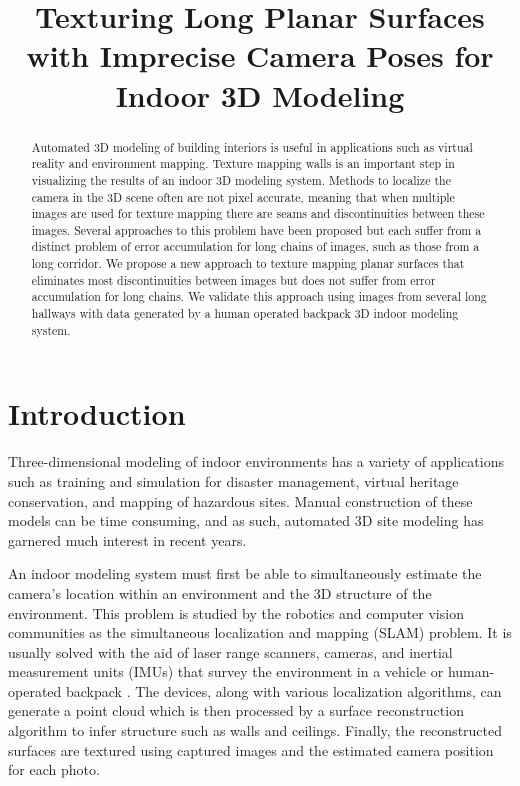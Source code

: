 \documentclass[runningheads]{llncs}
\begin{document}


\pagestyle{headings}

\mainmatter

\title{Texturing Long Planar Surfaces with Imprecise Camera Poses for Indoor 3D Modeling}

\maketitle

\begin{abstract}
Automated 3D modeling of building interiors is useful in
applications such as virtual reality and environment mapping.
Texture mapping walls is an important step in visualizing the results of an indoor 3D modeling system. Methods to localize the camera in the 3D scene often are not pixel accurate, meaning that when multiple images are used for texture mapping there are seams and discontinuities between these images. Several approaches to this problem have been proposed but each suffer from a distinct problem of error accumulation for long chains of images, such as those from a long corridor. We propose a new approach to texture mapping planar surfaces that eliminates most discontinuities between images but does not suffer from error accumulation for long chains. We validate this approach using images from several long hallways with data generated by a human operated backpack 3D indoor modeling system.

\end{abstract}

\section{Introduction}
\label{sec:intro}

Three-dimensional modeling of indoor environments has a variety of applications such as training and simulation for disaster management, virtual heritage conservation, and mapping of hazardous sites. Manual construction of these models can be time consuming, and as such, automated 3D site modeling has garnered much interest in recent years. 

An indoor modeling system must first be able to simultaneously estimate the camera's location within an environment and the 3D structure of the environment. This problem is studied by the robotics and computer vision communities as the simultaneous localization and mapping (SLAM) problem. It is usually solved with the aid of laser range scanners, cameras, and inertial measurement units (IMUs) that survey the environment in a vehicle or human-operated backpack \cite{liu2010indoor,chen2010indoor}. The devices, along with various localization algorithms, can generate a point cloud which is then processed by a surface reconstruction algorithm to infer structure such as walls and ceilings. Finally, the reconstructed surfaces are textured using captured images and the estimated camera position for each photo. 
\end{document}
